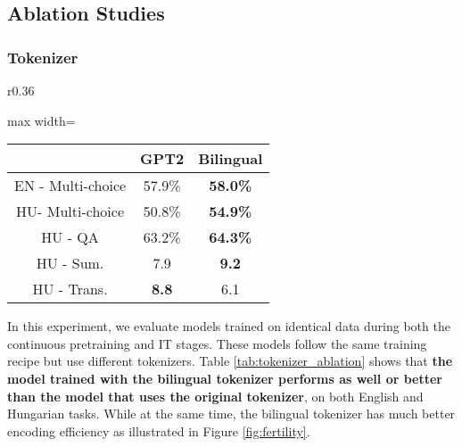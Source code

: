 {\subsection{Ablation Studies}\label{ablation_study}

\subsubsection{Tokenizer}\label{tokenizer ablation}

\begin{wraptable}[5]{r}{0.36\textwidth}
\vspace{-56pt}
\label{tab:tokenizer_ablation}
\begin{adjustbox}{max width=\linewidth}
\begin{tabular}{ccc}
\toprule
\multicolumn{1}{l}{} & \multicolumn{1}{c}{GPT2} & Bilingual \\
\midrule
EN - Multi-choice    &   57.9\%                   & \textbf{58.0\%}   \\
HU- Multi-choice     &  50.8\%                    & \textbf{54.9\%}   \\
HU - QA              &       63.2\%                   & \textbf{64.3\%}   \\
HU - Sum.            &     7.9                    & \textbf{9.2}     \\
HU - Trans.          &  \textbf{8.8}                        & 6.1     \\
\bottomrule
\end{tabular}
\end{adjustbox}
\end{wraptable}

In this experiment, we evaluate models trained on identical data during both the continuous pretraining and IT stages. These models follow the same training recipe but use different tokenizers. Table \ref{tab:tokenizer_ablation} shows that \textbf{the model trained with the bilingual tokenizer performs as well or better than the model that uses the original tokenizer}, on both English and Hungarian tasks. While at the same time, the bilingual tokenizer has much better encoding efficiency as illustrated in Figure \ref{fig:fertility}. 


}
